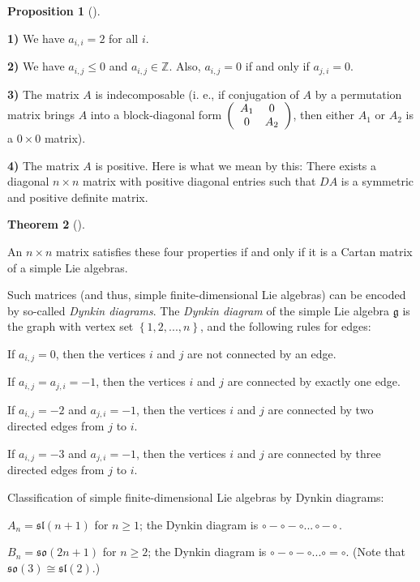 \documentclass
[numbers=enddot,12pt,final,onecolumn,german,notitlepage]{scrartcl}%
\theoremstyle{definition}
\newtheorem{theo}{Theorem}
\newenvironment{theorem}[1][]
{\begin{theo}[#1]\begin{leftbar}}
{\end{leftbar}\end{theo}}
\newtheorem{prop}[theo]{Proposition}
\newenvironment{proposition}[1][]
{\begin{prop}[#1]\begin{leftbar}}
{\end{leftbar}\end{prop}}
\begin{document}
\begin{proposition}
\textbf{1)} We have $a_{i,i}=2$ for all $i$.

\textbf{2)} We have $a_{i,j}\leq0$ and $a_{i,j}\in\mathbb{Z}$. Also,
$a_{i,j}=0$ if and only if $a_{j,i}=0$.

\textbf{3)} The matrix $A$ is indecomposable (i. e., if conjugation of $A$ by
a permutation matrix brings $A$ into a block-diagonal form $\left(
\begin{array}
[c]{cc}%
A_{1} & 0\\
0 & A_{2}%
\end{array}
\right)  $, then either $A_{1}$ or $A_{2}$ is a $0\times0$ matrix).

\textbf{4)} The matrix $A$ is positive. Here is what we mean by this: There
exists a diagonal $n\times n$ matrix with positive diagonal entries such that
$DA$ is a symmetric and positive definite matrix.
\end{proposition}

\begin{theorem}
An $n\times n$ matrix satisfies these four properties if and only if it is a
Cartan matrix of a simple Lie algebras.
\end{theorem}

Such matrices (and thus, simple finite-dimensional Lie algebras) can be
encoded by so-called \textit{Dynkin diagrams}. The \textit{Dynkin diagram} of
the simple Lie algebra $\mathfrak{g}$ is the graph with vertex set $\left\{
1,2,...,n\right\}  $, and the following rules for edges:

If $a_{i,j}=0$, then the vertices $i$ and $j$ are not connected by an edge.

If $a_{i,j}=a_{j,i}=-1$, then the vertices $i$ and $j$ are connected by
exactly one edge.

If $a_{i,j}=-2$ and $a_{j,i}=-1$, then the vertices $i$ and $j$ are connected
by two directed edges from $j$ to $i$.

If $a_{i,j}=-3$ and $a_{j,i}=-1$, then the vertices $i$ and $j$ are connected
by three directed edges from $j$ to $i$.

Classification of simple finite-dimensional Lie algebras by Dynkin diagrams:

$A_{n}=\mathfrak{sl}\left(  n+1\right)  $ for $n\geq1$; the Dynkin diagram is
$\circ-\circ-\circ...\circ-\circ$.

$B_{n}=\mathfrak{so}\left(  2n+1\right)  $ for $n\geq2$; the Dynkin diagram is
$\circ-\circ-\circ...\circ=\circ$. (Note that $\mathfrak{so}\left(  3\right)
\cong\mathfrak{sl}\left(  2\right)  $.)
\end{document}
